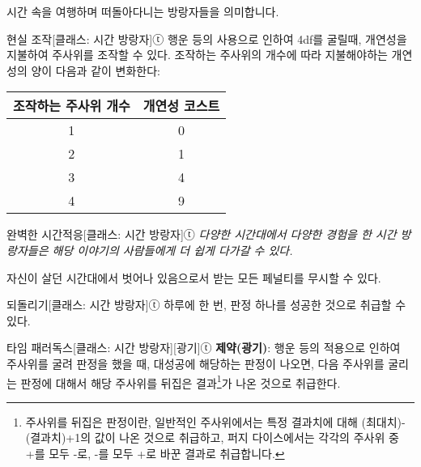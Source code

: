 \documentclass{report}
\begin{document}
	시간 속을 여행하며 떠돌아다니는 방랑자들을 의미합니다.
	
	\begin{story}{현실 조작}{[클래스: 시간 방랑자]ⓣ}
		행운 등의 사용으로 인하여 4df를 굴릴때, 개연성을 지불하여 주사위를 조작할 수 있다. 조작하는 주사위의 개수에 따라 지불해야하는 개연성의 양이 다음과 같이 변화한다:
		\begin{center}
			\begin{tabular}{c|c}
				\textbf{조작하는 주사위 개수} & \textbf{개연성 코스트} \\\hline\hline
				1                             & 0                      \\\hline
				2                             & 1                      \\\hline
				3                             & 4                      \\\hline
				4                             & 9                      \\\hline
				
			\end{tabular}
		\end{center}
		
	\end{story}
	
	\begin{story}{완벽한 시간적응}{[클래스: 시간 방랑자]ⓣ}
		\textit{다양한 시간대에서 다양한 경험을 한 시간 방랑자들은 해당 이야기의 사람들에게 더 쉽게 다가갈 수 있다.}
		
		자신이 살던 시간대에서 벗어나 있음으로서 받는 모든 페널티를 무시할 수 있다.
		
	\end{story}
	
	\begin{story}{되돌리기}{[클래스: 시간 방랑자]ⓣ}
		하루에 한 번, 판정 하나를 성공한 것으로 취급할 수 있다.
		
	\end{story}
	
	\begin{story}{타임 패러독스}{[클래스: 시간 방랑자][광기]ⓣ}
		\textbf{제약(광기)}: 행운 등의 적용으로 인하여 주사위를 굴려 판정을 했을 때, 대성공에 해당하는 판정이 나오면, 다음 주사위를 굴리는 판정에 대해서 해당 주사위를 뒤집은 결과\footnote{주사위를 뒤집은 판정이란, 일반적인 주사위에서는 특정 결과치에 대해 (최대치)-(결과치)+1의 값이 나온 것으로 취급하고, 퍼지 다이스에서는 각각의 주사위 중 +를 모두 -로, -를 모두 +로 바꾼 결과로 취급합니다.}가 나온 것으로 취급한다.
		
	\end{story}
\end{document}
